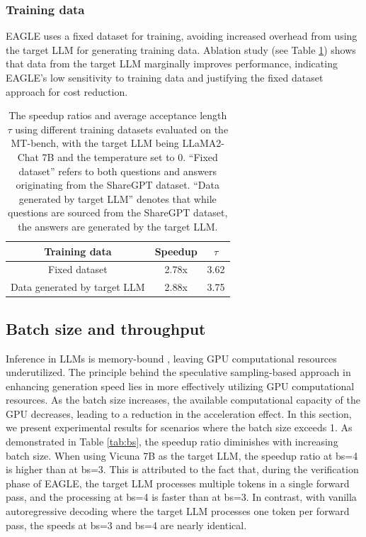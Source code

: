 \documentclass{article}
\theoremstyle{plain}
\theoremstyle{definition}
\theoremstyle{remark}
\begin{document}
\subsubsection{Training data}
\label{sec:abadata}

EAGLE uses a fixed dataset for training, avoiding increased overhead from using the target LLM for generating training data. Ablation study (see Table \ref{tab:training data}) shows that data from the target LLM marginally improves performance, indicating EAGLE's low sensitivity to training data and justifying the fixed dataset approach for cost reduction.

\begin{table}
  \centering
  \caption{The speedup ratios and average acceptance length $\tau$ using different training datasets evaluated on the MT-bench, with the target LLM being LLaMA2-Chat 7B and the temperature set to 0. ``Fixed dataset'' refers to both questions and answers originating from the ShareGPT dataset. ``Data generated by target LLM'' denotes that while questions are sourced from the ShareGPT dataset, the answers are generated by the target LLM.}
    \begin{tabular}{ccc}
    \toprule
    Training data & Speedup & $\tau$ \\
    \midrule
    Fixed dataset & 2.78x & 3.62 \\
    Data  generated by target LLM & 2.88x & 3.75 \\
    \bottomrule
    \end{tabular}%
  \label{tab:training data}%
\end{table}%




\subsection{Batch size and throughput}
\label{sec:bsne1}

Inference in LLMs is memory-bound \cite{patterson2004latency,shazeer2019fast}, leaving GPU computational resources underutilized. The principle behind the speculative sampling-based approach in enhancing generation speed lies in more effectively utilizing GPU computational resources. As the batch size increases, the available computational capacity of the GPU decreases, leading to a reduction in the acceleration effect. In this section, we present experimental results for scenarios where the batch size exceeds 1. As demonstrated in Table \ref{tab:bs}, the speedup ratio diminishes with increasing batch size. When using Vicuna 7B as the target LLM, the speedup ratio at bs=4 is higher than at bs=3. This is attributed to the fact that, during the verification phase of EAGLE, the target LLM processes multiple tokens in a single forward pass, and the processing at bs=4 is faster than at bs=3. In contrast, with vanilla autoregressive decoding where the target LLM processes one token per forward pass, the speeds at bs=3 and bs=4 are nearly identical.
\end{document}
